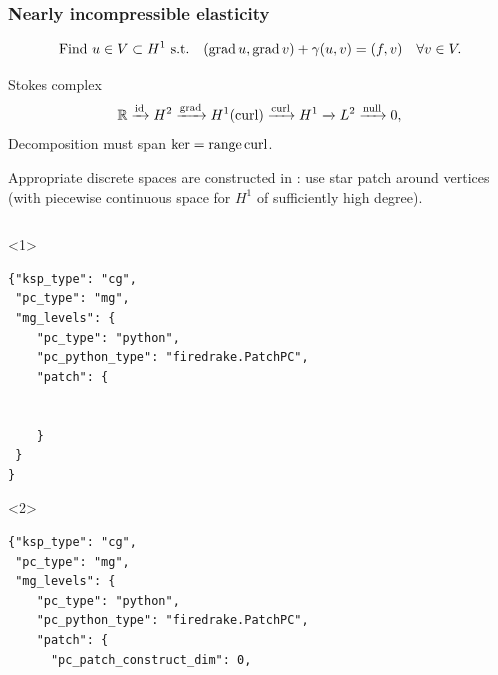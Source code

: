 \documentclass[presentation,aspectratio=43,10pt]{beamer}
\DeclareMathOperator{\grad}{grad}
\let\div\relax
\DeclareMathOperator{\div}{div}
\DeclareMathOperator{\curl}{curl}
\DeclareMathOperator{\range}{range}
\begin{document}
\begin{frame}[fragile]
  \frametitle{Nearly incompressible elasticity}
  \vspace*{-1.5\baselineskip}
  \begin{equation*}
    \text{Find $u \in V \subset H^1$ s.t.} \quad (\grad u, \grad v) + \gamma (\div u, \div v) = (f, v) \quad \forall v \in V.
  \end{equation*}
  \vspace*{-\baselineskip}
  \begin{block}{Stokes complex}
    \begin{equation*}
      \mathbb{R} \xrightarrow{\operatorname{id}} H^2 \xrightarrow{\grad} H^1(\curl)
      \xrightarrow{\curl} H^1 \xrightarrow{\div} L^2 \xrightarrow{\operatorname{null}} 0,
    \end{equation*}
    Decomposition must span $\ker \div = \range \curl$.

    Appropriate discrete spaces are constructed in \textcite{Neilan:2015a}: use
    star patch around vertices (with piecewise continuous space for
    $H^1$ of sufficiently high degree).
  \end{block}
  \begin{columns}
    \begin{column}{0.6\textwidth}
      \begin{onlyenv}<1>
\begin{verbatim}
{"ksp_type": "cg",
 "pc_type": "mg",
 "mg_levels": {
    "pc_type": "python",
    "pc_python_type": "firedrake.PatchPC",
    "patch": {


    }
 }
}
\end{verbatim}
      \end{onlyenv}
      \begin{onlyenv}<2>
\begin{verbatim}
{"ksp_type": "cg",
 "pc_type": "mg",
 "mg_levels": {
    "pc_type": "python",
    "pc_python_type": "firedrake.PatchPC",
    "patch": {
      "pc_patch_construct_dim": 0,


\end{verbatim}
\end{onlyenv}
\end{column}
\end{columns}
\end{frame}
\end{document}
